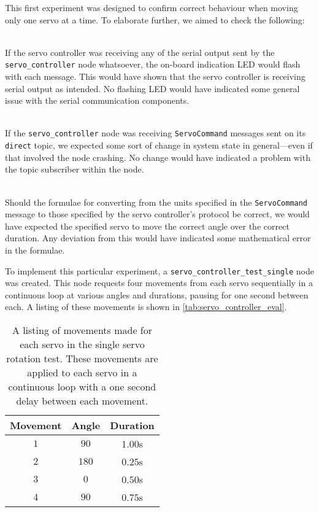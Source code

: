 This first experiment was designed to confirm correct behaviour when moving only one servo at a time. To elaborate further, we aimed to check the following:

\begin{description}[labelindent=\parindent]
	\item[Hardware Communication] \hfill \\
	If the servo controller was receiving any of the serial output sent by the \texttt{servo\_controller} node whatsoever, the on-board indication LED would flash with each message. This would have shown that the servo controller is receiving serial output as intended. No flashing LED would have indicated some general issue with the serial communication components.

	\item[Topic Reception] \hfill \\
	If the \texttt{servo\_controller} node was receiving \texttt{ServoCommand} messages sent on its \texttt{direct} topic, we expected some sort of change in system state in general---even if that involved the node crashing. No change would have indicated a problem with the topic subscriber within the node.

	\item[Index, Angle \& Duration Conversion] \hfill \\
	Should the formulae for converting from the units specified in the \texttt{ServoCommand} message to those specified by the servo controller's protocol be correct, we would have expected the specified servo to move the correct angle over the correct duration. Any deviation from this would have indicated some mathematical error in the formulae.
\end{description}

To implement this particular experiment, a \texttt{servo\_controller\_test\_single} node was created. This node requests four movements from each servo sequentially in a continuous loop at various angles and durations, pausing for one second between each. A listing of these movements is shown in \autoref{tab:servo_controller_eval}.

\begin{table}[!h]
	\centering
	\begin{tabular}{ c c c }
		\toprule
		\textbf{Movement} & \textbf{Angle} & \textbf{Duration} \\
		\midrule

		$1$ &
		$90$\textdegree{} &
		$1.00$s \\

		$2$ &
		$180$\textdegree{} &
		$0.25$s \\

		$3$ &
		$0$\textdegree{} &
		$0.50$s \\

		$4$ &
		$90$\textdegree{} &
		$0.75$s \\
		\bottomrule
	\end{tabular}
	\caption{A listing of movements made for each servo in the single servo rotation test. These movements are applied to each servo in a continuous loop with a one second delay between each movement.}
	\label{tab:servo_controller_eval}
\end{table}

